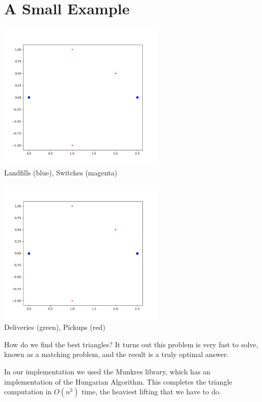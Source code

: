 \documentclass{beamer}
\begin{document}
\section{A Small Example}
\begin{frame}{}
	\vspace{-.3cm}
	\begin{center}
	\includegraphics[width=8cm]{landfill_nostar.png}\\
		Landfills (blue), Switches (magenta)
	\end{center}
\end{frame}

\begin{frame}{}
	\vspace{-.3cm}
	\begin{center}
		\includegraphics[width=8cm]{landfill_demo.png}\\
		Deliveries (green), Pickups (red)
	\end{center}

\end{frame}

\begin{frame}{How do we find the best triangles?}
	It turns out this problem is very fast to solve, known as a matching problem, and the result is a truly optimal answer.
	\vspace{.5cm}

	In our implementation we used the Munkres library, which has an implementation of the Hungarian Algorithm. This completes the triangle computation in $O(n^3)$ time, the heaviest lifting that we have to do.
\end{frame}
\end{document}
